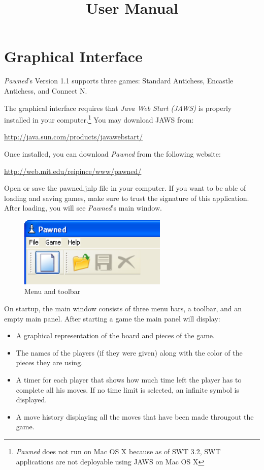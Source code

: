 \documentclass{report}
\title{User Manual}
\begin{document}
		\chapter{Graphical Interface}
	
			\emph{Pawned}'s Version 1.1 supports three games: Standard Antichess, 
			Encastle Antichess, and Connect N.
	
			The graphical interface requires that \emph{Java Web Start 
			(JAWS)} is properly installed in your computer.\footnote[1]{\emph{Pawned} 
			does not run on Mac OS X because as of SWT 3.2, SWT applications are 
			not deployable using JAWS on Mac OS X} You may download JAWS from:
				\begin{center}
					\url{http://java.sun.com/products/javawebstart/}				
				\end{center}
			Once installed, you can download \emph{Pawned} from the following website:
				\begin{center}
					\url{http://web.mit.edu/reipince/www/pawned/}				
				\end{center}
			Open or save the pawned.jnlp file in your computer. If you want to be able 
			of loading and saving games, make sure to trust the signature of this 
			application. After loading, you will see \emph{Pawned}'s main window.
				
				\begin{figure}
					\begin{center}
						\includegraphics[width=200pt]{img/menu-toolbar.png}
							\caption{Menu and toolbar}
					\end{center}
				\end{figure}
		
				
			On startup, the main window consists of three menu bars, a toolbar, and an 
			empty main panel. After starting a game the main panel will display:
			
				\begin{itemize}
						\item A graphical representation of the board and pieces of the game. 
						\item The names of the players (if they were given) along with the 
									color of the pieces they are using.
						\item A timer for each player that shows how much time left the player 
									has to complete all his moves. If no time limit is selected, 
									an infinite symbol is displayed.
						\item A move history displaying all the moves that have been made 
									througout the game.
				\end{itemize}			
				
\end{document}
